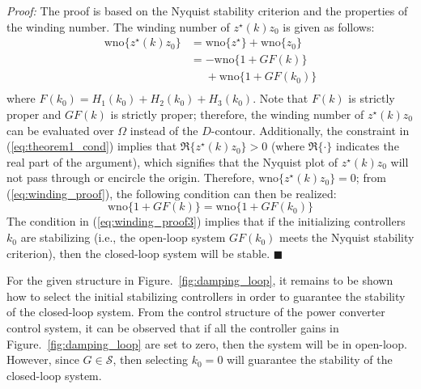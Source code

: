 \documentclass[a4paper, 10pt, conference]{ieeeconf}
\begin{document}
\textit{Proof:}
The proof is based on the Nyquist stability criterion and the properties of the winding number. The winding number of $z^{\star}(k)z_0$ is given as follows:
\begin{equation} \label{eq:winding_proof}
\begin{aligned}
{\mbox{wno}} \{ z^{\star}(k)z_0\} &= {\mbox{wno}} \{ z^{\star}\} + {\mbox{wno}} \{ z_0\} \\
&= -{\mbox{wno}} \{ 1+GF(k)\} \\
&\phantom{=} + {\mbox{wno}} \{ 1+GF(k_0)\} \\
\end{aligned}
\end{equation}
where $F(k_0) = H_1(k_0) + H_2(k_0) + H_3(k_0)$. Note that $F(k)$ is strictly proper and $GF(k)$ is strictly proper; therefore, the winding number of $z^{\star}(k)z_0$ can be evaluated over $\Omega$ instead of the $D$-contour. Additionally, the constraint in (\ref{eq:theorem1_cond}) implies that $\Re\{ z^{\star}(k)z_0\} > 0$ (where $\Re\{ \cdot \}$ indicates the real part of the argument), which signifies that the Nyquist plot of $z^{\star}(k)z_0$ will not pass through or encircle the origin. Therefore, $\mbox{wno} \{ z^{\star}(k)z_0\} = 0$; from (\ref{eq:winding_proof}), the following condition can then be realized:
\begin{equation} \label{eq:winding_proof3}
\mbox{wno} \{ 1+GF(k)\} = {\mbox{wno}} \{ 1+GF(k_0)\}
\end{equation}
The condition in (\ref{eq:winding_proof3}) implies that if the initializing controllers $k_0$ are stabilizing (i.e., the open-loop system $GF(k_0)$ meets the Nyquist stability criterion), then the closed-loop system will be stable.
{\hfill \ensuremath{\blacksquare}}

For the given structure in Figure.~\ref{fig:damping_loop}, it remains to be shown how to select the initial stabilizing controllers in order to guarantee the stability of the closed-loop system. From the control structure of the power converter control system, it can be observed that if all the controller gains in Figure.~\ref{fig:damping_loop} are set to zero, then the system will be in open-loop. However, since $G \in \mathscr{S}$, then selecting $k_0 = 0$ will guarantee the stability of the closed-loop system. 
\end{document}

